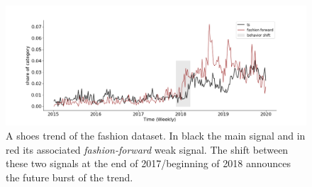 \documentclass{article} %
\begin{document}







\begin{figure}
  \centering
    \includegraphics[width=1.\linewidth]{figure/ff_example}
  \caption{A shoes trend of the fashion dataset. In black the main signal and in red its associated \textit{fashion-forward} weak signal. The shift between these two signals at the end of 2017/beginning of 2018 announces the future burst of the trend.}
\label{fig:oneemergingtrend}
\end{figure}
\end{document}
